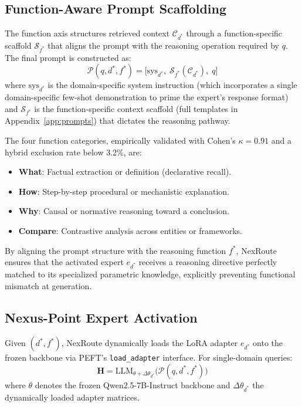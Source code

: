 \documentclass[a4paper,fleql]{cas-sc}
\begin{document}
\subsection{Function-Aware Prompt Scaffolding}
\label{ssec:functionaxis}
The function axis structures retrieved context $\mathcal{C}_{d^*}$ through
a function-specific scaffold $\mathcal{S}_{f^*}$ that aligns the prompt with
the reasoning operation required by $q$. The final prompt is constructed as:
\begin{equation}
    \mathcal{P}(q, d^*, f^*) = \big[ \text{sys}_{d^*},\;
    \mathcal{S}_{f^*}(\mathcal{C}_{d^*}),\; q \big]
    \label{eq:prompt}
\end{equation}
where $\text{sys}_{d^*}$ is the domain-specific system instruction
(which incorporates a single domain-specific few-shot demonstration to
prime the expert's response format) and $\mathcal{S}_{f^*}$ is the
function-specific context scaffold (full templates in
Appendix~\ref{app:prompts}) that dictates the reasoning pathway.

The four function categories, empirically validated with Cohen's $\kappa = 0.91$ and a hybrid exclusion rate below 3.2\%, are:

\begin{itemize}
    \item \textbf{What}: Factual extraction or definition (declarative recall).
    \item \textbf{How}: Step-by-step procedural or mechanistic explanation.
    \item \textbf{Why}: Causal or normative reasoning toward a conclusion.
    \item \textbf{Compare}: Contrastive analysis across entities or frameworks.
\end{itemize}


By aligning the prompt structure with the reasoning function $f^*$,
NexRoute ensures that the activated expert $e_{d^*}$ receives a reasoning
directive perfectly matched to its specialized parametric knowledge,
explicitly preventing functional mismatch at generation.
\subsection{Nexus-Point Expert Activation}
\label{ssec:nexus}
Given $(d^*, f^*)$, NexRoute dynamically loads the LoRA adapter $e_{d^*}$
onto the frozen backbone via PEFT's \texttt{load\_adapter} interface.
For single-domain queries:
\begin{equation}
    \mathbf{H} = \text{LLM}_{\theta + \Delta\theta_{d^*}} \big(
    \mathcal{P}(q, d^*, f^*) \big)
    \label{eq:single}
\end{equation}
where $\theta$ denotes the frozen Qwen2.5-7B-Instruct backbone and
$\Delta\theta_{d^*}$ the dynamically loaded adapter matrices.
\end{document}
